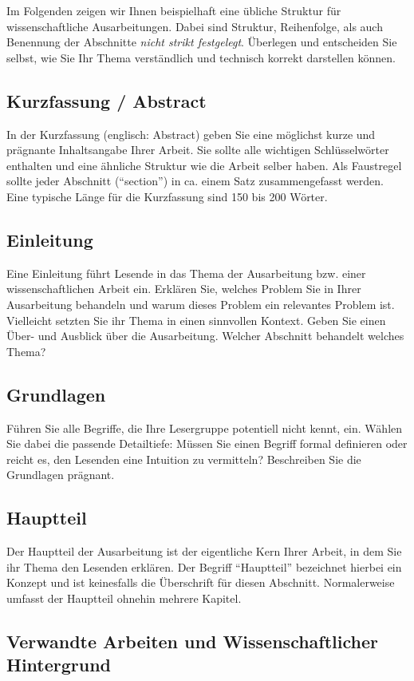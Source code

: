 Im Folgenden zeigen wir Ihnen beispielhaft eine übliche Struktur für wissenschaftliche
Ausarbeitungen. Dabei sind Struktur, Reihenfolge, als auch Benennung der Abschnitte \emph{nicht
  strikt festgelegt}. Überlegen und entscheiden Sie selbst, wie Sie Ihr Thema verständlich und
technisch korrekt darstellen können.

\subsection{Kurzfassung / Abstract}
In der Kurzfassung (englisch: Abstract) geben Sie eine möglichst kurze und prägnante Inhaltsangabe
Ihrer Arbeit.
Sie sollte alle wichtigen Schlüsselwörter enthalten und eine ähnliche Struktur wie die Arbeit selber
haben.
Als Faustregel sollte jeder Abschnitt (``section'') in ca. einem Satz zusammengefasst werden.
Eine typische Länge für die Kurzfassung sind 150 bis 200 Wörter.

\subsection{Einleitung}
Eine Einleitung führt Lesende in das Thema der Ausarbeitung bzw. einer wissenschaftlichen Arbeit
ein. Erklären Sie, welches Problem Sie in Ihrer Ausarbeitung behandeln und warum dieses Problem ein
relevantes Problem ist. Vielleicht setzten Sie ihr Thema in einen sinnvollen Kontext. Geben Sie
einen Über- und Ausblick über die Ausarbeitung. Welcher Abschnitt behandelt welches Thema?

\subsection{Grundlagen}
Führen Sie alle Begriffe, die Ihre Lesergruppe potentiell nicht kennt, ein. Wählen Sie dabei die
passende Detailtiefe: Müssen Sie einen Begriff formal definieren oder reicht es, den Lesenden eine
Intuition zu vermitteln? Beschreiben Sie die Grundlagen prägnant.

\subsection{Hauptteil}
Der Hauptteil der Ausarbeitung ist der eigentliche Kern Ihrer Arbeit, in dem Sie ihr Thema den Lesenden
erklären. Der Begriff ``Hauptteil'' bezeichnet hierbei ein Konzept und ist keinesfalls die
Überschrift für diesen Abschnitt. Normalerweise umfasst der Hauptteil ohnehin mehrere Kapitel.

\subsection{Verwandte Arbeiten und Wissenschaftlicher Hintergrund}

